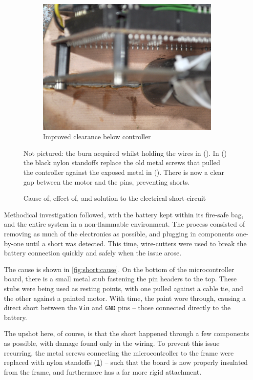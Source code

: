 \documentclass[main.tex]{subfiles}
\begin{document}
\begin{figure}[b]
\begin{subfigure}[t]{\linewidth/3 - 1em}
			\includegraphics[width=\linewidth]{figures/standoffs.jpg}
			\caption{Improved clearance below controller}
			\label{fig:clearance}
		\end{subfigure}
		\caption{Cause of, effect of, and solution to the electrical short-circuit}
		\label{fig:short}
		\medskip
		\small
		Not pictured: the burn acquired whilst holding the wires in ().
		In () the black nylon standoffs replace the old metal screws that pulled the controller against the exposed metal in ().
		There is now a clear gap between the motor and the pins, preventing shorts.
	\end{figure}

	Methodical investigation followed, with the battery kept within its fire-safe bag, and the entire system in a non-flammable environment. The process consisted of removing as much of the electronics as possible, and plugging in components one-by-one until a short was detected. This time, wire-cutters were used to break the battery connection quickly and safely when the issue arose.

	The cause is shown in \cref{fig:short:cause}. On the bottom of the microcontroller board, there is a small metal stub fastening the pin headers to the top. These stubs were being used as resting points, with one pulled against a cable tie, and the other against a painted motor. With time, the paint wore through, causing a direct short between the \texttt{Vin} and \texttt{GND} pins -- those connected directly to the battery.

	The upshot here, of course, is that the short happened through a few components as possible, with damage found only in the wiring. To prevent this issue recurring, the metal screws connecting the microcontroller to the frame were replaced with nylon standoffs (\cref{fig:clearance}) -- such that the board is now properly insulated from the frame, and furthermore has a far more rigid attachment.
\end{document}
